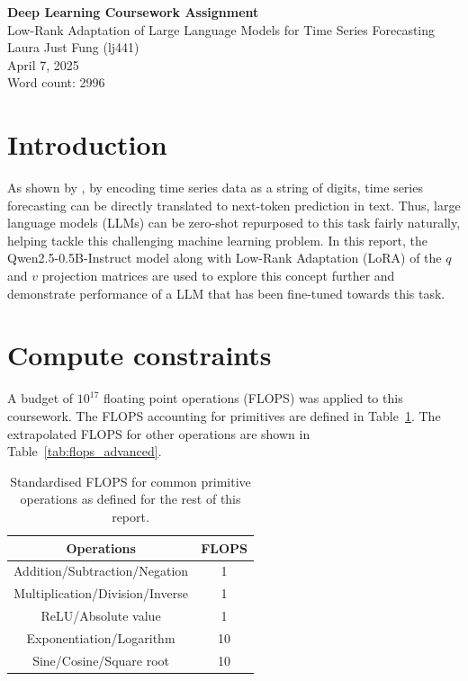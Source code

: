 \documentclass[11pt,a4paper]{article}
\renewcommand{\arraystretch}{0.8}
\begin{document}
 

\begin{center}
    \LARGE{\textbf{Deep Learning Coursework Assignment}}
    \\
    \Large{{Low-Rank Adaptation of Large Language Models for Time Series Forecasting}}
    \\
    \large{Laura Just Fung (lj441)}
    \\
    April 7, 2025
    \\
    Word count: 2996
\end{center}

\section{Introduction}
As shown by \citeauthor{gruver2024largelanguagemodelszeroshot}, by encoding time series data as a string of digits, time series forecasting can be directly translated to next-token prediction in text. Thus, large language models (LLMs) can be zero-shot repurposed to this task fairly naturally, helping tackle this challenging machine learning problem. In this report, the Qwen2.5-0.5B-Instruct model \citep{yang2024qwen2technicalreport} along with Low-Rank Adaptation (LoRA) of the $q$ and $v$ projection matrices are used to explore this concept further and demonstrate performance of a LLM that has been fine-tuned towards this task.

\section{Compute constraints}
\label{sec:constraints}
A budget of $10^{17}$ floating point operations (FLOPS) was applied to this coursework. The FLOPS accounting for primitives are defined in Table~\ref{tab:flops_primitives}. The extrapolated FLOPS for other operations are shown in Table~\ref{tab:flops_advanced}.
\renewcommand{\arraystretch}{1.2}
\begin{table}[h]
    \centering
    \begin{tabular}{c|c}
        Operations & FLOPS \\
        \hline
        Addition/Subtraction/Negation & 1 \\
        Multiplication/Division/Inverse & 1 \\
        ReLU/Absolute value & 1 \\
        Exponentiation/Logarithm & 10\\
        Sine/Cosine/Square root & 10 \\
        
    \end{tabular}
    \caption{Standardised FLOPS for common primitive operations as defined for the rest of this report.}
    \label{tab:flops_primitives}
\end{table}
\end{document}
